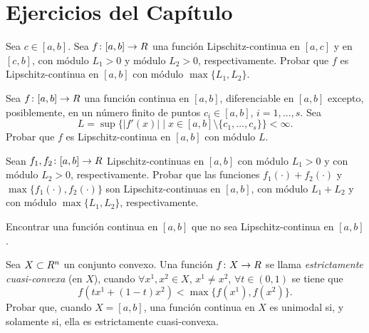 
\section*{Ejercicios del Capítulo}

\begin{exercise}\label{v2:ejer:2.3.1}
    Sea $c \in [a, b]$. Sea $f \colon [a, b] \to R$ una función Lipschitz-continua en $[a, c]$ y en $[c, b]$, con módulo $L_1 > 0$ y módulo $L_2 > 0$, respectivamente. Probar que $f$ es Lipschitz-continua en $[a, b]$ con módulo $\max\{L_1, L_2\}$.
\end{exercise}

\begin{exercise}\label{v2:ejer:2.3.2}
    Sea $f \colon [a, b] \to R$ una función continua en $[a, b]$, diferenciable en $[a, b]$ excepto, posiblemente, en un número finito de puntos $c_i \in [a, b]$, $i = 1, \dots, s$. Sea
    \[
        L = \sup \{ |f'(x)| \mid x \in [a, b] \setminus \{c_1, \dots, c_s\} \} < \infty.
    \]
    Probar que $f$ es Lipschitz-continua en $[a, b]$ con módulo $L$.
\end{exercise}

\begin{exercise}\label{v2:ejer:2.3.3}
    Sean $f_1, f_2 \colon [a, b] \to R$ Lipschitz-continuas en $[a, b]$ con módulo $L_1 > 0$ y con módulo $L_2 > 0$, respectivamente. Probar que las funciones $f_1(\cdot) + f_2(\cdot)$ y $\max\{f_1(\cdot), f_2(\cdot)\}$ son Lipschitz-continuas en $[a, b]$, con módulo $L_1 + L_2$ y con módulo $\max\{L_1, L_2\}$, respectivamente.
\end{exercise}

\begin{exercise}\label{v2:ejer:2.3.4}
    Encontrar una función continua en $[a, b]$ que no sea Lipschitz-continua en $[a, b]$.
\end{exercise}

\begin{exercise}\label{v2:ejer:2.3.5}
    Sea $X \subset R^n$ un conjunto convexo. Una función $f \colon X \to R$ se llama \textit{estrictamente cuasi-convexa} (en $X$), cuando $\forall x^1, x^2 \in X$, $x^1 \neq x^2$, $\forall t \in (0, 1)$ se tiene que
    \[
        f(tx^1 + (1 - t)x^2) < \max\{f(x^1), f(x^2)\}.
    \]
    Probar que, cuando $X = [a, b]$, una función continua en $X$ es unimodal si, y solamente si, ella es estrictamente cuasi-convexa.
\end{exercise}

